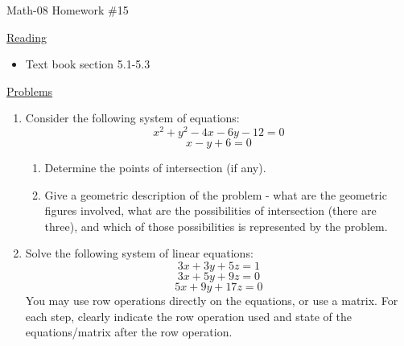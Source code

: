 \documentclass[letterpaper,12pt,fleqn]{article}
\begin{document}
\begin{center}
\Large Math-08 Homework \#15
\end{center}

\vspace{0.5in}

\underline{Reading}

\begin{itemize}
\item Text book section 5.1-5.3
\end{itemize}

\underline{Problems}

\begin{enumerate}

\item Consider the following system of equations:
  \[x^2+y^2-4x-6y-12=0\]
  \[x-y+6=0\]
  \begin{enumerate}
  \item Determine the points of intersection (if any).
  \item Give a geometric description of the problem - what are the
    geometric figures involved, what are the possibilities of intersection
    (there are three), and which of those possibilities is represented by the
    problem.
  \end{enumerate}

\item Solve the following system of linear equations:
  \[3x+3y+5z=1\]
  \[3x+5y+9z=0\]
  \[5x+9y+17z=0\]
  You may use row operations directly on the equations, or use a matrix. For
  each step, clearly indicate the row operation used and state of the
  equations/matrix after the row operation.
\end{enumerate}
\end{document}
